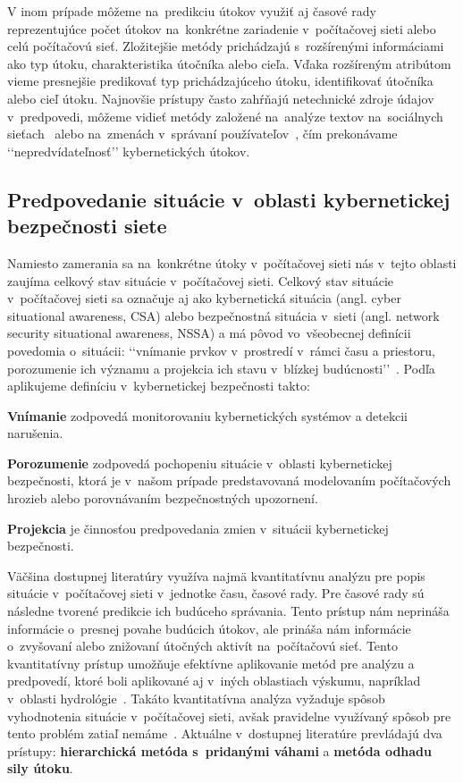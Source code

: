 \documentclass[thesismargins, thesislinespacing, openright, upjsfrontpage]{rnthesis}
\begin{document}
V inom prípade môžeme na~predikciu útokov využiť aj časové rady reprezentujúce počet útokov na~konkrétne zariadenie v~počítačovej sieti alebo celú počítačovú sieť. Zložitejšie metódy prichádzajú s~rozšírenými informáciami ako typ útoku, charakteristika útočníka alebo cieľa. Vďaka rozšíreným atribútom vieme presnejšie predikovať typ prichádzajúceho útoku, identifikovať útočníka alebo cieľ útoku. Najnovšie prístupy často zahŕňajú netechnické zdroje údajov v~predpovedi, môžeme vidieť metódy založené na~analýze textov na~sociálnych sieťach~\cite{hernandez2016security,shu2018understanding} alebo na~zmenách v~správaní používateľov~\cite{shao2016transparent}, čím prekonávame ‘‘nepredvídateľnosť’’ kybernetických útokov.

\subsection{Predpovedanie situácie v~oblasti kybernetickej bezpečnosti siete} \label{forecast}

Namiesto zamerania sa na~konkrétne útoky v~počítačovej sieti nás v~tejto oblasti zaujíma celkový stav situácie v~počítačovej sieti. Celkový stav situácie v~počítačovej sieti sa označuje aj ako kybernetická situácia (angl. cyber situational awareness, CSA) alebo bezpečnostná situácia v~sieti (angl. network security situational awareness, NSSA) a má pôvod vo~všeobecnej definícii povedomia o~situácii: ‘‘vnímanie prvkov v~prostredí v~rámci času a priestoru, porozumenie ich významu a projekcia ich stavu v~blízkej budúcnosti’’~\cite{Endsley1988}. Podľa \cite{Yang2014} aplikujeme definíciu v~kybernetickej bezpečnosti takto: 

\begin{compactenum}
    \item \textbf{Vnímanie} zodpovedá monitorovaniu kybernetických systémov a detekcii narušenia.
    \item \textbf{Porozumenie} zodpovedá pochopeniu situácie v~oblasti kybernetickej bezpečnosti, ktorá je v~našom prípade predstavovaná modelovaním počítačových hrozieb alebo porovnávaním bezpečnostných upozornení. 
    \item \textbf{Projekcia} je činnosťou predpovedania zmien v~situácii kybernetickej bezpečnosti. 
\end{compactenum}

Väčšina dostupnej literatúry využíva najmä kvantitatívnu analýzu pre popis situácie v~počítačovej sieti v~jednotke času, časové rady. Pre časové rady sú následne tvorené predikcie ich budúceho správania. Tento prístup nám neprináša informácie o~presnej povahe budúcich útokov, ale prináša nám informácie o~zvyšovaní alebo znižovaní útočných aktivít na~počítačovú sieť. Tento kvantitatívny prístup umožňuje efektívne aplikovanie metód pre analýzu a predpovedí, ktoré boli aplikované aj v~iných oblastiach výskumu, napríklad v~oblasti hydrológie~\cite{wang2009comparison}. Takáto kvantitatívna analýza vyžaduje spôsob vyhodnotenia situácie v~počítačovej sieti, avšak pravidelne využívaný spôsob pre tento problém zatiaľ nemáme~\cite{husak2020preprint}. Aktuálne v~dostupnej literatúre prevládajú dva prístupy: \textbf{hierarchická metóda s~pridanými váhami} a \textbf{metóda odhadu sily útoku}. 
\end{document}

